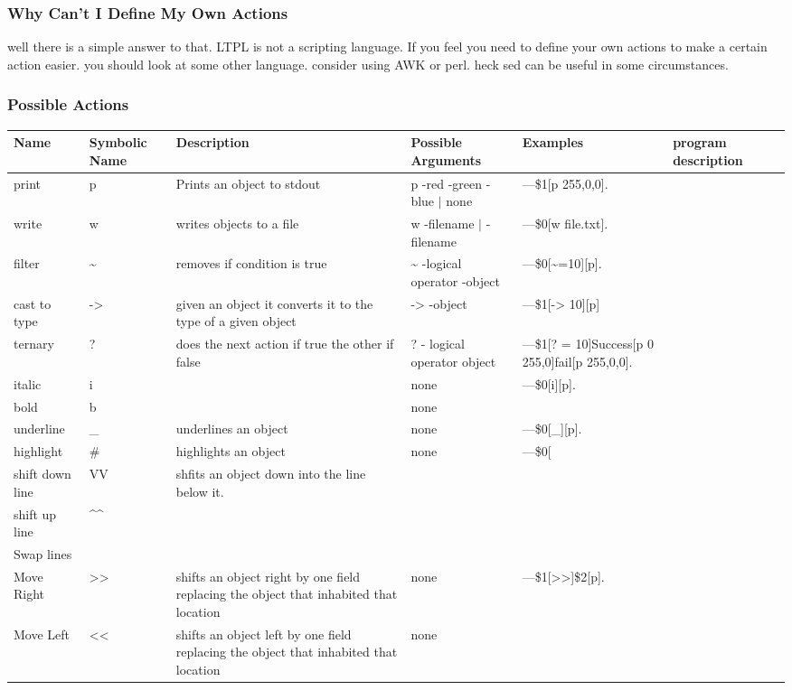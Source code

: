 \documentclass[11pt]{article}
\begin{document}
\subsubsection{Why Can't I Define My Own Actions}
\label{sec:org53e6820}
well there is a simple answer to that. LTPL is not a scripting language. If you feel you need to define your own actions to make a certain action easier. you should look at some other language.
consider using AWK or perl. heck sed can be useful in some circumstances. 
\subsubsection{Possible Actions}
\label{sec:org9297faf}


\begin{center}
\begin{tabular}{lllllll}
\hline
Name & Symbolic Name & Description & Possible Arguments & Examples & program description & \\
\hline
print & p & Prints an object to stdout & p -red -green -blue \(\vert{}\) none & ---\$1[p 255,0,0]. &  & \\
write & w & writes objects to a file & w -filename \(\vert{}\) -filename & ---\$0[w file.txt]. &  & \\
\hline
filter & \textasciitilde{} & removes if condition is true & \textasciitilde{} -logical operator -object & ---\$0[\textasciitilde{}=10][p]. &  & \\
cast to type & -> & given an object it converts it to the type of a given object & -> -object & ---\$1[-> 10][p] &  & \\
ternary & ? & does the next action if true the other if false & ? - logical operator object & ---\$1[? = 10]Success[p 0 255,0]fail[p 255,0,0]. &  & \\
\hline
italic & i &  & none & ---\$0[i][p]. &  & \\
bold & b &  & none &  &  & \\
underline & \_ & underlines an object & none & ---\$0[\_][p]. &  & \\
highlight & \# & highlights an object & none & ---\$0[ &  & \\
shift down line & VV & shfits an object down into the line below it. &  &  &  & \\
shift up line & \^{}\^{} &  &  &  &  & \\
Swap lines\\
Move Right & >> & shifts an object right by one field replacing the object that inhabited that location & none & ---\$1[>>]\$2[p]. &  & \\
Move Left & << & shifts an object left by one field replacing the object that inhabited that location & none &  &  & \\
\hline
\end{tabular}
\end{center}
\end{document}

